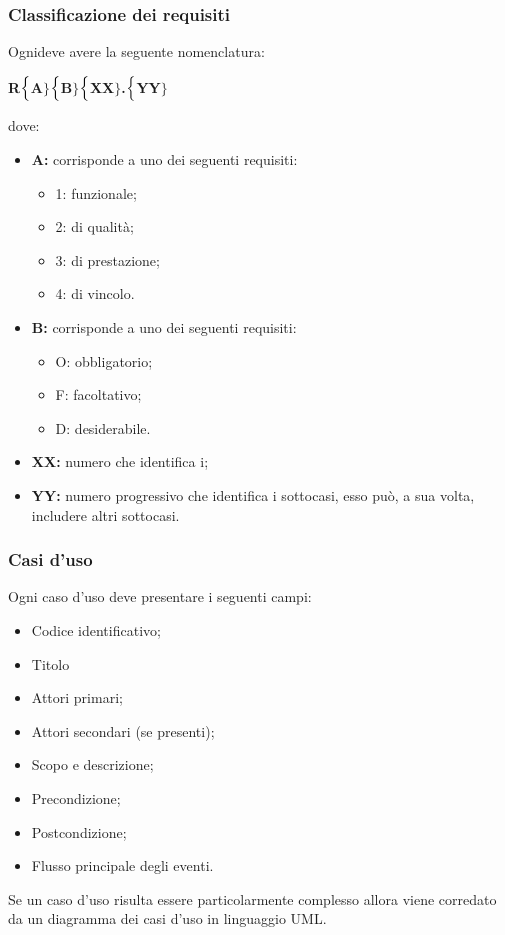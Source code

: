 \subsubsection{Classificazione dei requisiti}
Ognideve avere la seguente nomenclatura:
\begin{center}
	\textbf{R$\Bigl\{$A$\Bigr\}$$\Bigl\{$B$\Bigr\}$$\Bigl\{$XX$\Bigr\}$.$\Bigl\{$YY$\Bigr\}$}
\end{center}
dove:
\begin{itemize}
	\item \textbf{A:} corrisponde a uno dei seguenti requisiti:
	\begin{itemize}
		\item 1: funzionale;
		\item 2: di qualità;
		\item 3: di prestazione;
		\item 4: di vincolo.
	\end{itemize}
	\item \textbf{B:} corrisponde a uno dei seguenti requisiti:
	\begin{itemize}
		\item O: obbligatorio;
		\item F: facoltativo;
		\item D: desiderabile.
	\end{itemize}
	\item \textbf{{XX}:} numero che identifica i;
	\item \textbf{{YY}:} numero progressivo che identifica i sottocasi, esso può, a sua volta, includere altri sottocasi.
\end{itemize}

\subsubsection{Casi d'uso}
Ogni caso d'uso deve presentare i seguenti campi:
\begin{itemize}
	\item Codice identificativo;
	\item Titolo
	\item Attori primari;
	\item Attori secondari (se presenti);
	\item Scopo e descrizione;
	\item Precondizione;
	\item Postcondizione;
	\item Flusso principale degli eventi.
\end{itemize}
Se un caso d'uso risulta essere particolarmente complesso allora viene corredato da un diagramma dei casi d'uso in linguaggio UML.
